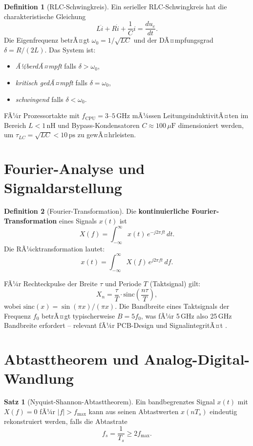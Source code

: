 ﻿\documentclass[a4paper,12pt]{scrreprt}
\theoremstyle{definition}
\newtheorem{definition}{Definition}[chapter]
\newtheorem{satz}{Satz}[chapter]
\begin{document}
	\begin{definition}[RLC-Schwingkreis]
		Ein serieller RLC-Schwingkreis hat die charakteristische Gleichung
		\[
		L\ddot{i} + R\dot{i} + \frac{1}{C}i = \frac{d u_e}{dt}.
		\]
		Die Eigenfrequenz betrÃ¤gt $\omega_0 = 1/\sqrt{LC}$ und der
		DÃ¤mpfungsgrad $\delta = R/(2L)$. Das System ist:
		\begin{itemize}
			\item \emph{Ã¼berdÃ¤mpft} falls $\delta > \omega_0$,
			\item \emph{kritisch gedÃ¤mpft} falls $\delta = \omega_0$,
			\item \emph{schwingend} falls $\delta < \omega_0$.
		\end{itemize}
	\end{definition}
	
	FÃ¼r Prozessortakte mit $f_{\text{CPU}} = 3$--$5\,\text{GHz}$ mÃ¼ssen
	LeitungsinduktivitÃ¤ten im Bereich $L < 1\,\text{nH}$ und
	Bypass-Kondensatoren $C \approx 100\,\mu\text{F}$ dimensioniert werden,
	um $\tau_{LC} = \sqrt{LC} < 10\,\text{ps}$ zu gewÃ¤hrleisten.
	
	\section{Fourier-Analyse und Signaldarstellung}
	
	\begin{definition}[Fourier-Transformation]
		Die \textbf{kontinuierliche Fourier-Transformation} eines Signals $x(t)$ ist
		\[
		X(f) = \int_{-\infty}^{\infty} x(t)\, e^{-j2\pi f t}\, dt.
		\]
		Die RÃ¼cktransformation lautet:
		\[
		x(t) = \int_{-\infty}^{\infty} X(f)\, e^{j2\pi f t}\, df.
		\]
	\end{definition}
	
	FÃ¼r Rechteckpulse der Breite $\tau$ und Periode $T$ (Taktsignal) gilt:
	\[
	X_n = \frac{\tau}{T} \cdot \text{sinc}\!\left(\frac{n\tau}{T}\right),
	\]
	wobei $\text{sinc}(x) = \sin(\pi x)/(\pi x)$. Die Bandbreite eines
	Takt\-signals der Frequenz $f_0$ betrÃ¤gt typischerweise $B = 5f_0$,
	was fÃ¼r 5\,GHz also 25\,GHz Bandbreite erfordert -- relevant fÃ¼r
	PCB-Design und SignalintegritÃ¤t \cite{Epp2026signalth}.
	
	\section{Abtasttheorem und Analog-Digital-Wandlung}
	
	\begin{satz}[Nyquist-Shannon-Abtasttheorem]
		Ein bandbegrenztes Signal $x(t)$ mit $X(f) = 0$ fÃ¼r $|f| > f_{\max}$
		kann aus seinen Abtastwerten $x(nT_s)$ eindeutig rekonstruiert werden,
		falls die Abtastrate
		\[
		f_s = \frac{1}{T_s} \geq 2 f_{\max}.
		\]
	\end{satz}
	
\end{document}
